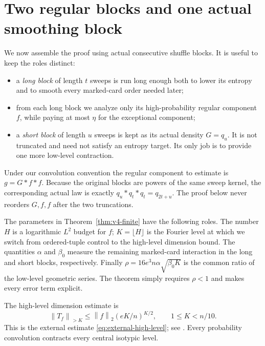 \documentclass[11pt]{article}
\numberwithin{equation}{section}
\theoremstyle{definition}\newtheorem{definition}[theorem]{Definition}
\theoremstyle{remark}\newtheorem{remark}[theorem]{Remark}
\newcommand{\norm}[1]{\left\lVert#1\right\rVert}
\begin{document}
\section{Two regular blocks and one actual smoothing block}\label{sec:three-block}
We now assemble the proof using actual consecutive shuffle blocks.  It is
useful to keep the roles distinct:
\begin{itemize}[leftmargin=2em]
\item a \emph{long block} of length $t$ sweeps is run long enough both to lower
its entropy and to smooth every marked-card order needed later;
\item from each long block we analyze only its high-probability regular
component $f$, while paying at most $\eta$ for the exceptional component;
\item a \emph{short block} of length $u$ sweeps is kept as its actual density
$G=q_u$.  It is not truncated and need not satisfy an entropy target.  Its
only job is to provide one more low-level contraction.
\end{itemize}
Under our convolution convention the regular component to estimate is
$g=G*f*f$.  Because the original blocks are powers of the same sweep kernel,
the corresponding actual law is exactly $q_u*q_t*q_t=q_{2t+u}$.  The proof
below never reorders $G,f,f$ after the two truncations.

The parameters in Theorem~\ref{thm:v4-finite} have the following roles.
The number $H$ is a logarithmic $L^2$ budget for $f$; $K=\lfloor H\rfloor$ is
the Fourier level at which we switch from ordered-tuple control to the
high-level dimension bound.  The quantities $\alpha$ and $\beta_0$ measure the
remaining marked-card interaction in the long and short blocks, respectively.
Finally
$\rho=16e^3n\alpha\sqrt{\beta_0K}$ is the common ratio of the low-level
geometric series.  The theorem simply requires $\rho<1$ and makes every error
term explicit.

The high-level dimension estimate is
\begin{equation}\label{eq:high-dimension}
 \norm{T_f}_{>K}\le\norm f_2(eK/n)^{K/2},\qquad1\le K<n/10.
\end{equation}
This is the external estimate \eqref{eq:external-high-level}; see \cite[Theorem 4.4 and Lemma 4.5]{KeevashLifshitz2023}.
Every probability convolution contracts every central isotypic level.
\end{document}

